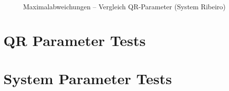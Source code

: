\begin{figure}
	\caption{Maximalabweichungen -- Vergleich QR-Parameter (System Ribeiro)}
	\label{fig:qrvglrib}
\end{figure}




\section{QR Parameter Tests}\label{sec:x0qr}



\section{System Parameter Tests}\label{sec:x0sys}

